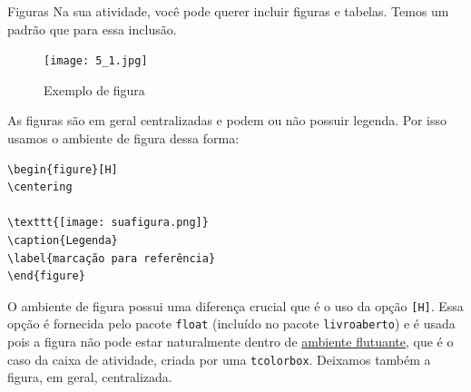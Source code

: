 \begin{task}{Figuras}
Na sua atividade, você pode querer incluir figuras e tabelas. Temos um padrão que para essa inclusão.

\begin{figure}[H]
\centering

\texttt{[image: 5\_1.jpg]}
\caption{Exemplo de figura}
\end{figure}

As figuras são em geral centralizadas e podem ou não possuir legenda. Por isso usamos o ambiente de figura dessa forma:

\begin{verbatim}
\begin{figure}[H]
\centering

\texttt{[image: suafigura.png]}
\caption{Legenda}
\label{marcação para referência}
\end{figure}
\end{verbatim}

O ambiente de figura possui uma diferença crucial que é o uso da opção \verb|[H]|. Essa opção é fornecida pelo pacote \verb|float| (incluído no pacote \verb|livroaberto|) e é usada pois a figura não pode estar naturalmente dentro de \href{https://en.wikibooks.org/wiki/LaTeX/Floats,_Figures_and_Captions}{ambiente flutuante}, que é o caso da caixa de atividade, criada por uma \verb|tcolorbox|. Deixamos também a figura, em geral, centralizada.

\end{task}

